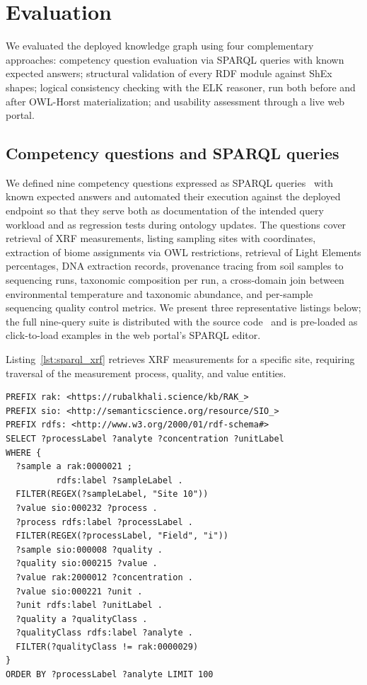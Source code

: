 \documentclass[11pt,a4paper]{article}
\begin{document}
\section{Evaluation}\label{sec:eval}

We evaluated the deployed knowledge graph using four complementary
approaches: competency question evaluation via SPARQL queries with
known expected answers; structural validation of every RDF module
against ShEx shapes; logical consistency checking with the ELK
reasoner, run both before and after OWL-Horst materialization; and
usability assessment through a live web portal.

\subsection{Competency questions and SPARQL queries}

We defined nine competency questions expressed as SPARQL
queries~\cite{sparql} with known expected answers and automated their
execution against the deployed endpoint so that they serve both as
documentation of the intended query workload and as regression tests
during ontology updates. The questions cover retrieval of XRF
measurements, listing sampling sites with coordinates, extraction of
biome assignments via OWL restrictions, retrieval of Light Elements
percentages, DNA extraction records, provenance tracing from soil
samples to sequencing runs, taxonomic composition per run, a
cross-domain join between environmental temperature and taxonomic
abundance, and per-sample sequencing quality control metrics. We
present three representative listings below; the full nine-query
suite is distributed with the source
code~\cite{gigadb_rak,zenodo_rak} and is pre-loaded as
click-to-load examples in the web portal's SPARQL editor.

Listing~\ref{lst:sparql_xrf} retrieves XRF measurements for a specific
site, requiring traversal of the measurement process, quality, and
value entities.

\begin{lstlisting}[caption={SPARQL query to retrieve field XRF
    measurements for Site 10.},
  label={lst:sparql_xrf}, basicstyle=\ttfamily\scriptsize, frame=single]
PREFIX rak: <https://rubalkhali.science/kb/RAK_>
PREFIX sio: <http://semanticscience.org/resource/SIO_>
PREFIX rdfs: <http://www.w3.org/2000/01/rdf-schema#>
SELECT ?processLabel ?analyte ?concentration ?unitLabel
WHERE {
  ?sample a rak:0000021 ;
          rdfs:label ?sampleLabel .
  FILTER(REGEX(?sampleLabel, "Site 10"))
  ?value sio:000232 ?process .
  ?process rdfs:label ?processLabel .
  FILTER(REGEX(?processLabel, "Field", "i"))
  ?sample sio:000008 ?quality .
  ?quality sio:000215 ?value .
  ?value rak:2000012 ?concentration .
  ?value sio:000221 ?unit .
  ?unit rdfs:label ?unitLabel .
  ?quality a ?qualityClass .
  ?qualityClass rdfs:label ?analyte .
  FILTER(?qualityClass != rak:0000029)
}
ORDER BY ?processLabel ?analyte LIMIT 100
\end{lstlisting}
\end{document}
